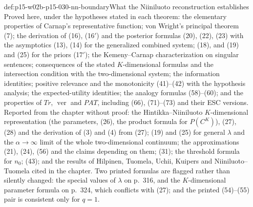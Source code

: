 \begin{proofboundary}{def:p15-w02b-p15-030-nn-boundary}{What the Niiniluoto reconstruction establishes}
Proved here, under the hypotheses stated in each theorem: the elementary
properties of Carnap's representative function; von Wright's principal
theorem (7); the derivation of (16), (16\('\)) and the posterior formulas
(20), (22), (23) with the asymptotics (13), (14) for the generalized
combined system; (18), and (19) and (25) for the priors (17\('\)); the
Kemeny--Carnap characterization on singular sentences; consequences of the
stated \(K\)-dimensional formulas and the intersection condition with the
two-dimensional system; the information identities; positive relevance
and the monotonicity (41)--(42) with the hypothesis analysis; the
expected-utility identities; the analogy formulas (58)--(60); and the
properties of \(Tr\), \(\operatorname{ver}\) and \(PAT\), including (66), (71)--(73)
and their ESC versions. Reported from the chapter without proof: the
Hintikka--Niiniluoto \(K\)-dimensional representation (the parameters,
(26), the product formula for \(P(C^K)\)), (27), (28) and the derivation of
(3) and (4) from (27); (19) and (25) for general \(\lambda\) and the
\(\alpha\to\infty\) limit of the whole two-dimensional continuum; the
approximations (21), (24), (56) and the claims depending on them; (31); the
threshold formula for \(n_0\); (43); and the results of Hilpinen, Tuomela,
Uchii, Kuipers and Niiniluoto--Tuomela cited in the chapter. Two printed
formulas are flagged rather than silently changed: the special values of
\(\lambda\) on p.~316, and the \(K\)-dimensional parameter formula on p.~324,
which conflicts with (27); and the printed (54)--(55) pair is consistent
only for \(q=1\).
\end{proofboundary}
